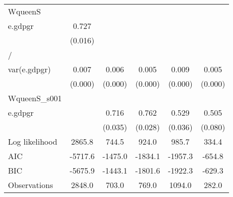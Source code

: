 \begin{table}[htbp]
\begin{tabular}{l*{5}{c}}
\hline
WqueenS             &                     &                     &                     &                     &                     \\
e.gdpgr             &       0.727\sym{***}&                     &                     &                     &                     \\
                    &     (0.016)         &                     &                     &                     &                     \\
\hline
/                   &                     &                     &                     &                     &                     \\
var(e.gdpgr)        &       0.007\sym{***}&       0.006\sym{***}&       0.005\sym{***}&       0.009\sym{***}&       0.005\sym{***}\\
                    &     (0.000)         &     (0.000)         &     (0.000)         &     (0.000)         &     (0.000)         \\
\hline
WqueenS\_s001        &                     &                     &                     &                     &                     \\
e.gdpgr             &                     &       0.716\sym{***}&       0.762\sym{***}&       0.529\sym{***}&       0.505\sym{***}\\
                    &                     &     (0.035)         &     (0.028)         &     (0.036)         &     (0.080)         \\
\hline
Log likelihood      &      2865.8         &       744.5         &       924.0         &       985.7         &       334.4         \\
AIC                 &     -5717.6         &     -1475.0         &     -1834.1         &     -1957.3         &      -654.8         \\
BIC                 &     -5675.9         &     -1443.1         &     -1801.6         &     -1922.3         &      -629.3         \\
Observations        &      2848.0         &       703.0         &       769.0         &      1094.0         &       282.0         \\
\hline\hline
\end{tabular}
\end{table}
